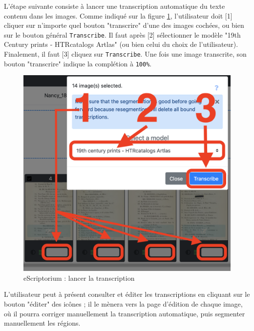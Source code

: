 \documentclass[a4paper,12pt,twoside]{book}
\begin{document}
L'étape suivante consiste à lancer une transcription automatique du texte contenu dans les images. Comme indiqué sur la figure \ref{transcrire}, l'utilisateur doit [1] cliquer sur n'importe quel bouton "transcrire" d'une des images cochées, ou bien sur le bouton général \texttt{Transcribe}. Il faut après [2] sélectionner le modèle "19th Century prints - HTRcatalogs Artlas" (ou bien celui du choix de l'utilisateur). Finalement, il faut [3] cliquez sur \texttt{Transcribe}. Une fois une image transcrite, son bouton "transcrire" indique la complétion à \texttt{100\%}. 
\begin{figure}[ht]
	\centering
	\includegraphics[scale=0.4]{transcribe_eScriptorium.png}		
	\caption{eScriptorium : lancer la transcription}
	\label{transcrire}
\end{figure}

L'utilisateur peut à présent consulter et éditer les transcriptions en cliquant sur le bouton "éditer" des icônes ; il le mènera vers la page d'édition de chaque image, où il pourra corriger manuellement la transcription automatique, puis segmenter manuellement les régions.
\end{document}
